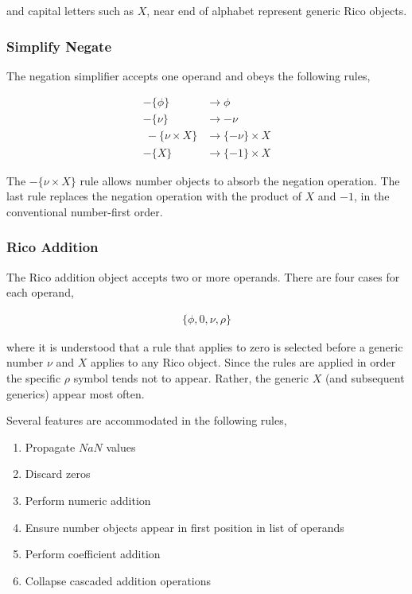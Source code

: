 and capital letters such as $X$, near end of alphabet represent generic Rico objects.

\subsubsection{Simplify Negate}

The negation simplifier accepts one operand and obeys the following rules,

\begin{align*}
-\{\phi\}          &\rightarrow \phi\\
-\{\nu\}           &\rightarrow -\nu\\\
-\{\nu \times X\}  &\rightarrow \{-\nu\} \times X\\
-\{X\}             &\rightarrow \{-1\} \times X
\end{align*}

The $-\{\nu \times X\}$ rule allows number objects to absorb the negation operation. The last rule replaces the negation operation with the product of $X$ and $-1$, in the conventional number-first order.

\subsubsection{Rico Addition}

The Rico addition object accepts two or more operands. There are four cases for each operand, 

\begin{align*}
\{\phi, 0, \nu, \rho\}
\end{align*}

where it is understood that a rule that applies to zero is selected before a generic number $\nu$ and $X$ applies to any Rico object. Since the rules are applied in order the specific $\rho$ symbol tends not to appear. Rather, the generic $X$ (and subsequent generics) appear most often.

Several features are accommodated in the following rules,

\begin{enumerate}
\item Propagate $NaN$ values
\item Discard zeros
\item Perform numeric addition
\item Ensure number objects appear in first position in list of operands
\item Perform coefficient addition
\item Collapse cascaded addition operations
\end{enumerate}

